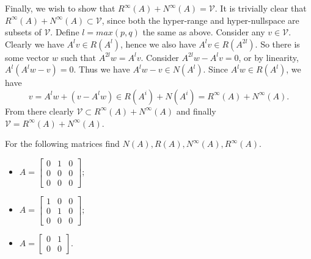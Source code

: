 \documentclass{article}
\begin{document}
\begin{solution}
  Finally, we wish to show that $R^{\infty}(A) + N^{\infty}(A) = \mathcal{V}$.
  It is trivially clear that $R^{\infty}(A) + N^{\infty}(A) \subset \mathcal{V}$, since both the hyper-range and hyper-nullspace are subsets of $\mathcal{V}$.
  Define $l = max(p, q)$ the same as above.
  Consider any $v \in \mathcal{V}$.
  Clearly we have $A^l v \in R(A^l)$, hence we also have $A^l v \in R(A^{2 l})$.
  So there is some vector $w$ such that $A^{2 l} w = A^l v$.
  Consider $A^{2 l} w - A^l v = 0$, or by linearity, $A^l (A^l w - v) = 0$.
  Thus we have $A^l w - v \in N(A^l)$.
  Since $A^l w \in R(A^l)$, we have
  \[v = A^l w + (v - A^l w) \in R(A^i) + N(A^i) = R^{\infty}(A) + N^{\infty}(A).\]
  From there clearly $\mathcal{V} \subset R^{\infty}(A) + N^{\infty}(A)$ and finally $\mathcal{V} = R^{\infty}(A) + N^{\infty}(A)$.
\end{solution}

\begin{problem}
  For the following matrices find $N(A), R(A), N^{\infty}(A), R^{\infty}(A)$.
  \begin{itemize}
    \item $A = \begin{bmatrix} 0 & 1 & 0\\ 0 & 0 & 0\\ 0 & 0 & 0 \end{bmatrix};$
    \item $A = \begin{bmatrix} 1 & 0 & 0\\ 0 & 1 & 0\\ 0 & 0 & 0 \end{bmatrix};$
    \item $A = \begin{bmatrix} 0 & 1\\ 0 & 0 \end{bmatrix}.$
  \end{itemize}
\end{problem}
\end{document}
